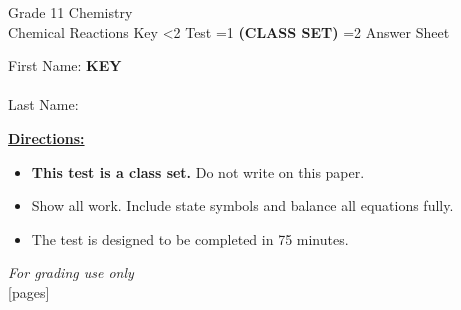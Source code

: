 \documentclass[addpoints]{exam}
\newcommand{\event}{Chemical Reactions}
\newcommand{\tournament}{}
\def\type{0}
\begin{document}
\begin{center}
    {\huge Grade 11 Chemistry \\ \event
    \ifprintanswers \space Key
    \else \space \ifnum\type<2 Test \fi \ifnum\type=1 \textbf{(CLASS SET)} \fi
          \ifnum\type=2 Answer Sheet \fi
    \fi \\ \vspace{3mm}\tournament\vspace{1mm}}
\end{center}

\vspace{.25\textheight}

\begin{center}
    First Name: \ifprintanswers
    \underline{\hspace{3.5cm}}\textbf{KEY}\underline{\hspace{5.5cm}}\\\vspace{5mm}
    \else \underline{\hspace{10cm}}\\ \vspace{5mm} \fi
    Last Name: \underline{\hspace{10cm}}\\ \vspace{5mm}
\end{center}

\noindent\textbf{\underline{Directions:}}
\begin{itemize}
    \ifnum\type=1 \item \textbf{This test is a class set.} Do not write on this paper. \fi
    \item Show all work. Include state symbols and balance all equations fully.
    \item The test is designed to be completed in 75 minutes.
\end{itemize}
\begin{center}
\textit{For grading use only}\\
[pages]
\end{center}
\end{document}
